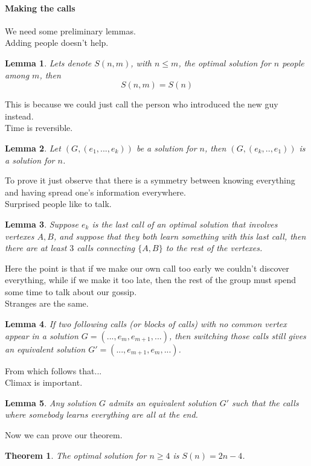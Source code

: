 \documentclass{article}
\newtheorem{lemma}{Lemma}
\newtheorem{theor}{Theorem}
\begin{document}
\paragraph{Making the calls\\}
We need some preliminary lemmas.\\
Adding people doesn't help.
\begin{lemma}
Lets denote $S(n,m)$, with $n\leq m$, the optimal solution for $n$ people among $m$, then
\begin{equation*}
S(n,m)=S(n)
\end{equation*}
\end{lemma}
This is because we could just call the person who introduced the new guy instead.\\
Time is reversible.
\begin{lemma}
Let $(G,(e_1,...,e_k))$ be a solution for $n$, then $(G,(e_k,..,e_1))$ is a solution for $n$.
\end{lemma}
To prove it just observe that there is a symmetry between knowing everything and having spread one's information everywhere.\\
Surprised people like to talk.
\begin{lemma}
Suppose $e_k$ is the last call of an optimal solution that involves vertexes $A,B$, and suppose that they both learn something with this last call, then there are at least $3$ calls connecting $\{A,B\}$ to the rest of the vertexes.
\end{lemma}
Here the point is that if we make our own call too early we couldn't discover everything, while if we make it too late, then the rest of the group must spend some time to talk about our gossip.\\
Stranges are the same.
\begin{lemma}
If two following calls (or blocks of calls) with no common vertex appear in a solution $G=(...,e_m,e_{m+1},...)$, then switching those calls still gives an equivalent solution $G'=(...,e_{m+1},e_m,...)$.
\end{lemma}
From which follows that...\\
Climax is important.
\begin{lemma}
Any solution $G$ admits an equivalent solution $G'$ such that the calls where somebody learns everything are all at the end.
\end{lemma}
Now we can prove our theorem.
\begin{theor}
The optimal solution for $n\geq 4$ is $S(n)=2n-4$.
\end{theor}
\end{document}
